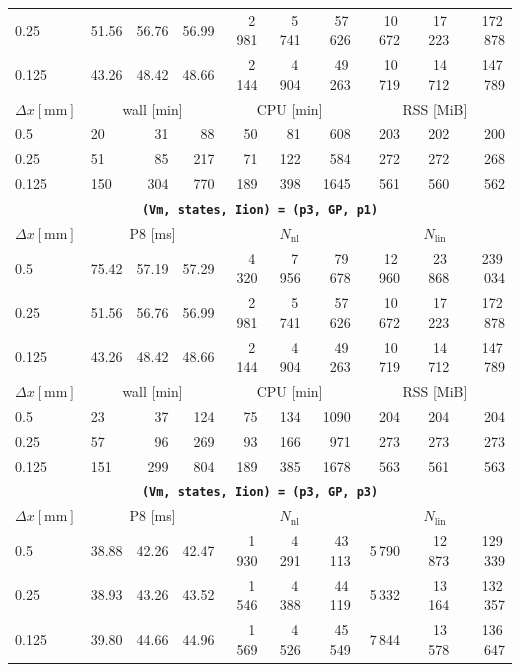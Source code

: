 \documentclass[11pt,a4paper]{article}
\newcommand{\code}[1]{\texttt{\small #1}}
\begin{document}
\begin{center}
\begin{longtable}{l|lrr|rrr|rrr}
0.25 & 51.56 & 56.76 & 56.99 & 2\,981 & 5\,741 & 57\,626 & 10\,672 & 17\,223 & 172\,878\\
0.125 & 43.26 & 48.42 & 48.66 & 2\,144 & 4\,904 & 49\,263 & 10\,719 & 14\,712 & 147\,789\\
\hline
$ \Delta x [\text{mm}] $ & \multicolumn{3}{c|}{wall [min]} & \multicolumn{3}{c|}{CPU [min]} & \multicolumn{3}{c|}{RSS [MiB]}\\
0.5 & 20 & 31 & 88 & 50 & 81 & 608 & 203 & 202 & 200\\
0.25 & 51 & 85 & 217 & 71 & 122 & 584 & 272 & 272 & 268\\
0.125 & 150 & 304 & 770 & 189 & 398 & 1645 & 561 & 560 & 562\\
\hline
\hline
\multicolumn{10}{c}{\textbf{\code{(Vm, states, Iion) = (p3, GP, p1)}}}\\\hline
$ \Delta x [\text{mm}] $ & \multicolumn{3}{c|}{P8 [ms]} & \multicolumn{3}{c|}{$N_{\mathrm{nl}}$} & \multicolumn{3}{c|}{$N_{\mathrm{lin}}$}\\
0.5 & 75.42 & 57.19 & 57.29 & 4\,320 & 7\,956 & 79\,678 & 12\,960 & 23\,868 & 239\,034\\
0.25 & 51.56 & 56.76 & 56.99 & 2\,981 & 5\,741 & 57\,626 & 10\,672 & 17\,223 & 172\,878\\
0.125 & 43.26 & 48.42 & 48.66 & 2\,144 & 4\,904 & 49\,263 & 10\,719 & 14\,712 & 147\,789\\
\hline
$ \Delta x [\text{mm}] $ & \multicolumn{3}{c|}{wall [min]} & \multicolumn{3}{c|}{CPU [min]} & \multicolumn{3}{c|}{RSS [MiB]}\\
0.5 & 23 & 37 & 124 & 75 & 134 & 1090 & 204 & 204 & 204\\
0.25 & 57 & 96 & 269 & 93 & 166 & 971 & 273 & 273 & 273\\
0.125 & 151 & 299 & 804 & 189 & 385 & 1678 & 563 & 561 & 563\\
\hline
\hline
\multicolumn{10}{c}{\textbf{\code{(Vm, states, Iion) = (p3, GP, p3)}}}\\\hline
$ \Delta x [\text{mm}] $ & \multicolumn{3}{c|}{P8 [ms]} & \multicolumn{3}{c|}{$N_{\mathrm{nl}}$} & \multicolumn{3}{c|}{$N_{\mathrm{lin}}$}\\
0.5 & 38.88 & 42.26 & 42.47 & 1\,930 & 4\,291 & 43\,113 & 5\,790 & 12\,873 & 129\,339\\
0.25 & 38.93 & 43.26 & 43.52 & 1\,546 & 4\,388 & 44\,119 & 5\,332 & 13\,164 & 132\,357\\
0.125 & 39.80 & 44.66 & 44.96 & 1\,569 & 4\,526 & 45\,549 & 7\,844 & 13\,578 & 136\,647\\

\end{longtable}
\end{center}
\end{document}
